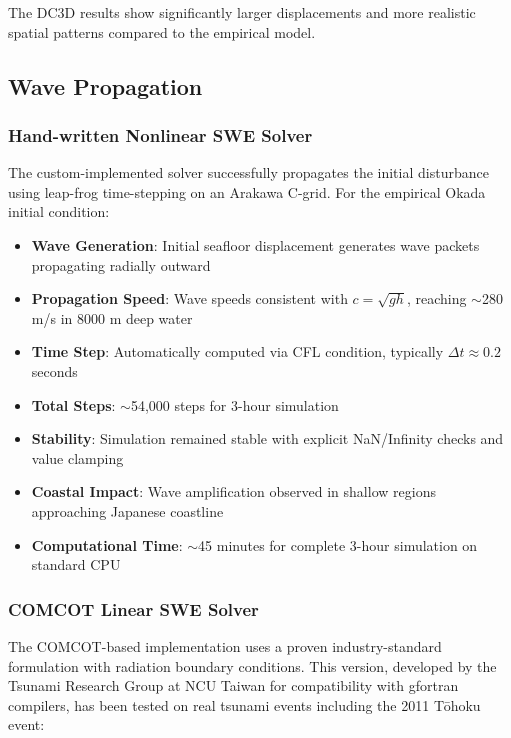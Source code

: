 \documentclass[12pt]{article}
\begin{document}
The DC3D results show significantly larger displacements and more realistic spatial patterns compared to the empirical model.

\subsection{Wave Propagation}

\subsubsection{Hand-written Nonlinear SWE Solver}

The custom-implemented solver successfully propagates the initial disturbance using leap-frog time-stepping on an Arakawa C-grid. For the empirical Okada initial condition:

\begin{itemize}
    \item \textbf{Wave Generation}: Initial seafloor displacement generates wave packets propagating radially outward
    \item \textbf{Propagation Speed}: Wave speeds consistent with $c = \sqrt{gh}$, reaching $\sim$280 m/s in 8000 m deep water
    \item \textbf{Time Step}: Automatically computed via CFL condition, typically $\Delta t \approx 0.2$ seconds
    \item \textbf{Total Steps}: $\sim$54,000 steps for 3-hour simulation
    \item \textbf{Stability}: Simulation remained stable with explicit NaN/Infinity checks and value clamping
    \item \textbf{Coastal Impact}: Wave amplification observed in shallow regions approaching Japanese coastline
    \item \textbf{Computational Time}: $\sim$45 minutes for complete 3-hour simulation on standard CPU
\end{itemize}

\subsubsection{COMCOT Linear SWE Solver}

The COMCOT-based implementation \cite{comcot_gfortran} uses a proven industry-standard formulation with radiation boundary conditions. This version, developed by the Tsunami Research Group at NCU Taiwan for compatibility with gfortran compilers, has been tested on real tsunami events including the 2011 Tōhoku event:
\end{document}
